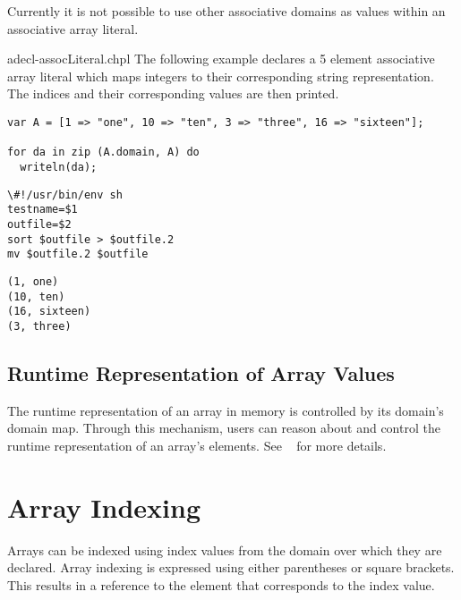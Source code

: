 \begin{openissue}
Currently it is not possible to use other associative domains as values within
an associative array literal.
\end{openissue}

\begin{chapelexample}{adecl-assocLiteral.chpl}
The following example declares a 5 element associative array literal which maps
integers to their corresponding string representation. The indices and their
corresponding values are then printed. 
\begin{chapel}
\begin{verbatim}
var A = [1 => "one", 10 => "ten", 3 => "three", 16 => "sixteen"];

for da in zip (A.domain, A) do
  writeln(da);
\end{verbatim}
\end{chapel}
\begin{chapelprediff}
\begin{verbatim}
\#!/usr/bin/env sh
testname=$1
outfile=$2
sort $outfile > $outfile.2
mv $outfile.2 $outfile
\end{verbatim}
\end{chapelprediff}
\begin{chapeloutput}
\begin{verbatim}
(1, one)
(10, ten)
(16, sixteen)
(3, three)
\end{verbatim}
\end{chapeloutput}
\end{chapelexample}

\subsection{Runtime Representation of Array Values}
\label{Array_Runtime_Representation}

The runtime representation of an array in memory is controlled by its
domain's domain map.  Through this mechanism, users can reason about
and control the runtime representation of an array's elements.  See
~ for more details.


\section{Array Indexing}
\label{Array_Indexing}

Arrays can be indexed using index values from the domain over which
they are declared.  Array indexing is expressed using either
parentheses or square brackets.  This results in a reference to the
element that corresponds to the index value.


